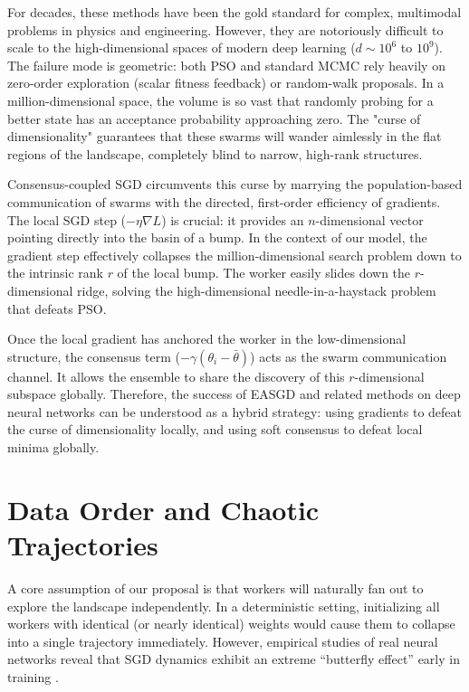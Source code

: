 \documentclass{article}
\begin{document}
For decades, these methods have been the gold standard for complex, multimodal problems in physics and engineering. However, they are notoriously difficult to scale to the high-dimensional spaces of modern deep learning ($d \sim 10^6$ to $10^9$). The failure mode is geometric: both PSO and standard MCMC rely heavily on zero-order exploration (scalar fitness feedback) or random-walk proposals. In a million-dimensional space, the volume is so vast that randomly probing for a better state has an acceptance probability approaching zero. The "curse of dimensionality" guarantees that these swarms will wander aimlessly in the flat regions of the landscape, completely blind to narrow, high-rank structures.

Consensus-coupled SGD circumvents this curse by marrying the population-based communication of swarms with the directed, first-order efficiency of gradients. The local SGD step ($-\eta \nabla L$) is crucial: it provides an $n$-dimensional vector pointing directly into the basin of a bump. In the context of our model, the gradient step effectively collapses the million-dimensional search problem down to the intrinsic rank $r$ of the local bump. The worker easily slides down the $r$-dimensional ridge, solving the high-dimensional needle-in-a-haystack problem that defeats PSO.

Once the local gradient has anchored the worker in the low-dimensional structure, the consensus term ($-\gamma(\theta_i - \bar{\theta})$) acts as the swarm communication channel. It allows the ensemble to share the discovery of this $r$-dimensional subspace globally. Therefore, the success of EASGD and related methods on deep neural networks can be understood as a hybrid strategy: using gradients to defeat the curse of dimensionality locally, and using soft consensus to defeat local minima globally.

\section{Data Order and Chaotic Trajectories}

A core assumption of our proposal is that workers will naturally fan out to explore the landscape independently. In a deterministic setting, initializing all workers with identical (or nearly identical) weights would cause them to collapse into a single trajectory immediately. However, empirical studies of real neural networks reveal that SGD dynamics exhibit an extreme ``butterfly effect'' early in training \cite{altintas2025butterfly}. 
\end{document}

